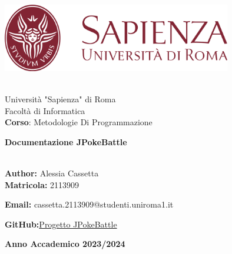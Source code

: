\documentclass[12pt]{article}
\begin{document}
\begin{titlepage}
    \begin{center}

        \includegraphics[width=0.75\textwidth]{Images/Uniroma1.svg.png}
        \par\medskip\noindent \\

        \large{Università "Sapienza" di Roma\\

            Facoltà di Informatica\\

            \textbf{Corso}: Metodologie Di Programmazione}\\

        \vfill

        \textbf {\Huge{Documentazione JPokeBattle}}
        \par\medskip\noindent \\
        \large{\textbf{Author: }Alessia Cassetta}\\

        \large{\textbf{Matricola: }2113909}

        \large{\textbf{Email:} cassetta.2113909@studenti.uniroma1.it}

        \large{\textbf{GitHub:}\href{https://github.com/ajhxia/UNI/tree/main/Primo%20Anno/Metodologie%20di%20Programmazione/Project-JPokeBattle}{Progetto JPokeBattle}}

        \vfill

        \textbf{Anno Accademico 2023/2024}

    \end{center}
\end{titlepage}
\newpage
\tableofcontents
\newpage
\end{document}
